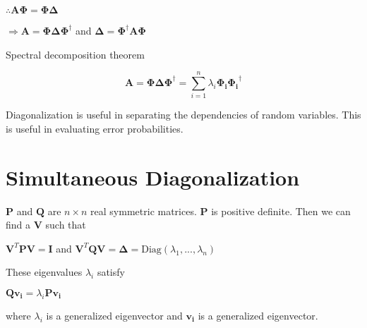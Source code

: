 \documentclass[fleqn]{article}
\begin{document}
	$\therefore \mathbf{A\Phi} = \mathbf{\Phi\Delta}$
	
	$\Rightarrow \mathbf{A} = \mathbf{\Phi\Delta}\mathbf{\Phi}^{\dag}$ and $\mathbf{\Delta} = \mathbf{\Phi}^{\dag}\mathbf{A\Phi}$
	
	Spectral decomposition theorem
	
	\begin{equation*}
		\mathbf{A} = \mathbf{\Phi\Delta}\mathbf{\Phi}^{\dag} = \sum_{i=1}^{n}\lambda_i\mathbf{\Phi_i}\mathbf{\Phi_i}^{\dag}
	\end{equation*}
	
	Diagonalization is useful in separating the dependencies of random variables. This is useful in evaluating error probabilities.
	
	\section{Simultaneous Diagonalization}
	
	$\mathbf{P}$ and $\mathbf{Q}$ are $n \times n$ real symmetric matrices. $\mathbf{P}$ is positive definite. Then we can find a $\mathbf{V}$ such that
	
	$\mathbf{V}^T\mathbf{PV} = \mathbf{I}$ and $\mathbf{V}^T\mathbf{QV} = \mathbf{\Delta} = \text{Diag}(\lambda_1,...,\lambda_n)$
	
	These eigenvalues $\lambda_i$ satisfy
	
	$\mathbf{Qv_i} = \lambda_i\mathbf{Pv_i}$
	
	where $\lambda_i$ is a generalized eigenvector and $\mathbf{v_i}$ is a generalized eigenvector.
\end{document}
